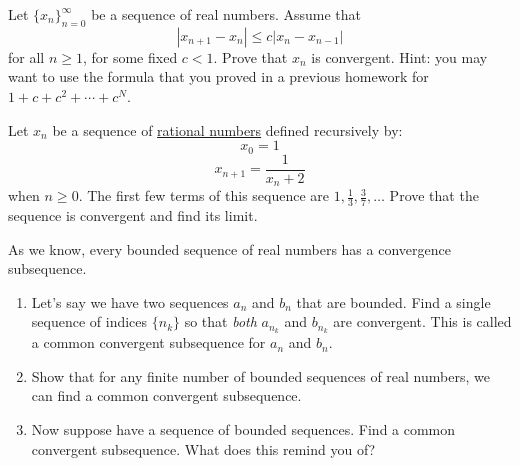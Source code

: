   \begin{exercise}
    Let $\{x_n\}_{n=0}^{\infty}$ be a sequence of real numbers. Assume that
    \begin{equation}
      |x_{n+1} - x_n| \leq c|x_n - x_{n-1}|
    \end{equation}
    for all $n \geq 1$, for some fixed $c < 1$. Prove that $x_n$ is convergent. Hint: you may want to use the formula that you proved in a previous homework for $1 + c + c^2 + \cdots + c^N$.
  \end{exercise}
  \begin{solution}
    
  \end{solution}

  \begin{exercise}
    Let $x_n$ be a sequence of \hyperref[alg-def:rational-numbers]{rational numbers} defined recursively by:
    \begin{equation}
      x_0 = 1
    \end{equation}
    \begin{equation}
      x_{n+1} = \frac{1}{x_n + 2}
    \end{equation}
    when $n \geq 0$. The first few terms of this sequence are $1, \frac{1}{3}, \frac{3}{7}, \ldots$ Prove that the sequence is convergent and find its limit.
  \end{exercise}
  \begin{solution}
    
  \end{solution}

  \begin{exercise}
    As we know, every bounded sequence of real numbers has a convergence subsequence.
    \begin{enumerate}
      \item Let's say we have two sequences $a_n$ and $b_n$ that are bounded. Find a single sequence of indices $\{n_k\}$ so that \emph{both} $a_{n_k}$ and $b_{n_k}$ are convergent. This is called a common convergent subsequence for $a_n$ and $b_n$.
      
      \item Show that for any finite number of bounded sequences of real numbers, we can find a common convergent subsequence.
      
      \item Now suppose have a sequence of bounded sequences. Find a common convergent subsequence. What does this remind you of?
    \end{enumerate}
  \end{exercise}
  \begin{solution}
    
  \end{solution}

